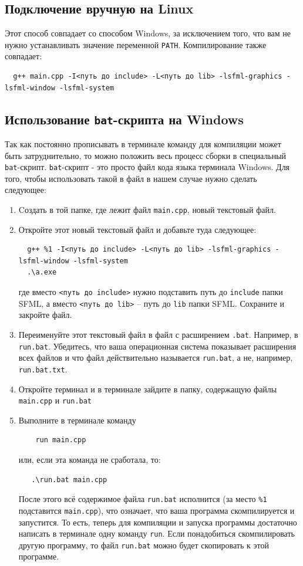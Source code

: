 \documentclass{article}
\begin{document}
\subsection*{Подключение вручную на Linux}
Этот способ совпадает со способом Windows, за исключением того, что вам не нужно устанавливать значение переменной \texttt{PATH}. Компилирование также совпадает:
\begin{verbatim}
  g++ main.cpp -I<путь до include> -L<путь до lib> -lsfml-graphics -lsfml-window -lsfml-system
\end{verbatim}

\subsection*{Использование \texttt{bat}-скрипта на Windows} 
Так как постоянно прописывать в терминале команду для компиляции может быть затруднительно, то можно положить весь процесс сборки в специальный \texttt{bat}-скрипт. \texttt{bat}-скрипт - это просто файл кода языка терминала Windows. Для того, чтобы использовать такой в файл в нашем случае нужно сделать следующее:
\begin{enumerate}
\item Cоздать в той папке, где лежит файл \texttt{main.cpp}, новый текстовый файл. 

\item Откройте этот новый текстовый файл и добавьте туда следующее:
\begin{verbatim}
  g++ %1 -I<путь до include> -L<путь до lib> -lsfml-graphics -lsfml-window -lsfml-system
  .\a.exe
\end{verbatim}
где вместо \texttt{<путь до include>} нужно подставить путь до \texttt{include} папки SFML, а вместо \texttt{<путь до lib>} -- путь до \texttt{lib} папки SFML. Сохраните и закройте файл.

\item Переименуйте этот текстовый файл в файл с расширением \texttt{.bat}. Например, в \texttt{run.bat}. Убедитесь, что ваша операционная система показывает расширения всех файлов и что файл действительно называется \texttt{run.bat}, а не, например, \texttt{run.bat.txt}.

\item Откройте терминал и в терминале зайдите в папку, содержащую файлы \texttt{main.cpp} и \texttt{run.bat}

\item Выполните в терминале команду
\begin{verbatim}
    run main.cpp
\end{verbatim}
или, если эта команда не сработала, то:
\begin{verbatim}
   .\run.bat main.cpp
\end{verbatim}
После этого всё содержимое файла \texttt{run.bat} исполнится (за место \texttt{\%1} подставится \texttt{main.cpp}), что означает, что ваша программа скомпилируется и запустится. То есть, теперь для компиляции и запуска программы достаточно написать в терминале одну команду \texttt{run}. Если понадобиться скомпилировать другую программу, то файл \texttt{run.bat} можно будет скопировать к этой программе.
\end{enumerate}
\end{document}
